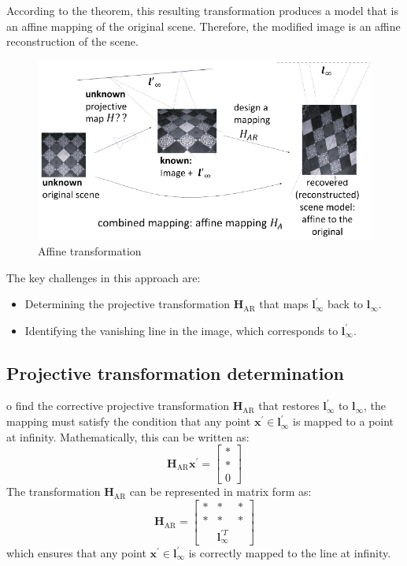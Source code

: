 According to the theorem, this resulting transformation produces a model that is an affine mapping of the original scene. 
Therefore, the modified image is an affine reconstruction of the scene.
\begin{figure}[H]
    \centering
    \includegraphics[width=0.75\linewidth]{images/HAR.png}
    \caption{Affine transformation}
\end{figure}
The key challenges in this approach are:
\begin{itemize}
    \item Determining the projective transformation $\mathbf{H}_{\text{AR}}$ that maps $\mathbf{l}^\prime_{\infty}$ back to $\mathbf{l}_{\infty}$.
    \item Identifying the vanishing line in the image, which corresponds to $\mathbf{l}^\prime_{\infty}$.
\end{itemize}

\subsection{Projective transformation determination}
o find the corrective projective transformation $\mathbf{H}_{\text{AR}}$ that restores $\mathbf{l}^\prime_{\infty}$ to $\mathbf{l}_{\infty}$, the mapping must satisfy the condition that any point $\mathbf{x}^\prime \in \mathbf{l}^\prime_{\infty}$ is mapped to a point at infinity.
Mathematically, this can be written as:
\[\mathbf{H}_{\text{AR}}\mathbf{x}^\prime = \begin{bmatrix} * \\ * \\ 0 \end{bmatrix}\]
The transformation $\mathbf{H}_{\text{AR}}$ can be represented in matrix form as:
\[\mathbf{H}_{\text{AR}} = \begin{bmatrix} * & * & * \\ * & * & * \\ & \mathbf{l}^{\prime T}_{\infty} & \end{bmatrix}\]
which ensures that any point $\mathbf{x}^\prime \in \mathbf{l}^\prime_{\infty}$ is correctly mapped to the line at infinity.

